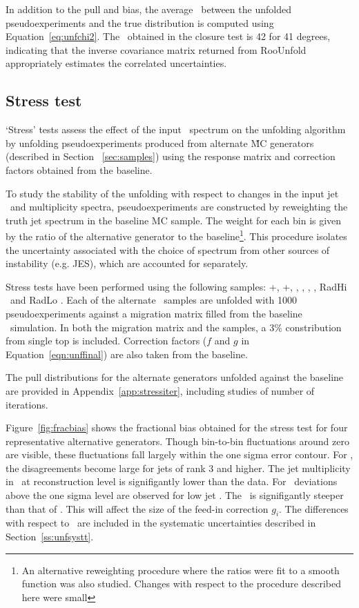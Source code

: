 In addition to the pull and bias, the average \chisq\ between the unfolded pseudoexperiments and the true distribution is computed using Equation~\ref{eq:unfchi2}.  The \chisq\ obtained in the closure test is 42 for 41 degrees, indicating that the
inverse covariance matrix returned from RooUnfold appropriately estimates the correlated uncertainties. 

\subsection{Stress test}
\label{ss:stress}
`Stress' tests assess the effect of the input \pt\ spectrum on the unfolding algorithm by unfolding pseudoexperiments produced from alternate \ttbar\~MC generators (described in Section ~\ref{sec:samples}) using the response matrix and correction factors
obtained from the baseline. 

To study the stability of the unfolding with respect to changes in the input jet \pt\ and multiplicity spectra, pseudoexperiments are constructed by reweighting the truth jet spectrum in the baseline MC sample. The weight for each bin is given by the ratio of the alternative generator to the baseline\footnote{An alternative reweighting procedure where the ratios were fit to a smooth function was also studied. Changes with respect to the procedure described here were small}. This procedure isolates the uncertainty associated with the choice of spectrum from other sources of instability (e.g. JES), which are accounted for separately. %

Stress tests have been performed using the following samples: \pow+\py, \pow+\hw, \madpy, \mcnlohw, \peight, \hdamp, RadHi \madpy\ and RadLo \madpy. Each of the alternate \ttbar\ samples are unfolded with 1000 pseudoexperiments against a migration matrix filled from the baseline \ttbar\ simulation. In both the migration matrix and the samples, a 3\% constribution from single top is included. Correction factors ($f$ and $g$ in Equation~\ref{eqn:unffinal}) are also taken from the baseline.

The pull distributions for the alternate generators unfolded against the baseline are provided in Appendix~\ref{app:stressiter}, including studies of number of iterations.

Figure~\ref{fig:fracbias} shows the fractional bias obtained for the stress test for four representative alternative generators. Though bin-to-bin fluctuations around zero are visible, these fluctuations fall largely within the one sigma error contour. For \mcnlohw, the disagreements become large for jets of rank 3 and higher. The jet multiplicity in \mcnlohw\ at reconstruction level is signifigantly lower than the data. For \madpy\ deviations above the one sigma level are observed for low jet \pt. The \madpy\ is signifigantly steeper than that of \powpy. This will affect the size of the feed-in correction $g_i$. The differences with respect to \madpy\ are included in the systematic uncertainties described in Section~\ref{ss:unfsystt}.

